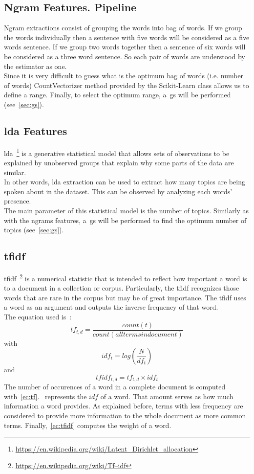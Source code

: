 \subsection{Ngram Features. Pipeline}
Ngram extractions consist of grouping the words into bag of words. If we group the words individually then a sentence with five words will be considered as a five words sentence. If we group two words together then a sentence of six words will be considered as a three word sentence. So each pair of words are understood by the estimator as one.\\
Since it is very difficult to guess what is the optimum bag of words (i.e. number of words) CountVectorizer method provided by the Scikit-Learn class allows us to define a range. Finally, to select the optimum range, a~\ac{gs} will be performed (see~\cref{sec:gs}).
\subsection{\acf{lda} Features}
\ac{lda}~\footnote{\url{https://en.wikipedia.org/wiki/Latent_Dirichlet_allocation}} is a generative statistical model that allows sets of observations to be explained by unobserved groups that explain why some parts of the data are similar.\\ In other words, \ac{lda} extraction can be used to extract how many topics are being spoken about in the dataset. This can be observed by analyzing each words' presence.\\
The main parameter of this statistical model is the number of topics. Similarly as with the ngrams features, a~\ac{gs} will be performed to find the optimum number of topics (see~\cref{sec:gs}).
\subsection{\acf{tfidf}}
\label{sec:tfidf}
\ac{tfidf}~\footnote{\url{https://en.wikipedia.org/wiki/Tf–idf}} is a numerical statistic that is intended to reflect how important a word is to a document in a collection or corpus. Particularly, the \ac{tfidf} recognizes those words that are rare in the corpus but may be of great importance. The \ac{tfidf} uses a word as an argument and outputs the inverse frequency of that word.\\
The equation used is~\cite{tfidf}:
\begin{equation}
\label{ec:tf}
	tf_{t,d} = \frac{count(t)}{count(alltermsindocument)}
\end{equation}
with
\begin{equation}
\label{ec:idf}
	idf_t=log(\frac{N}{df_t})
\end{equation}
and
\begin{equation}
\label{ec:tfidf}
	tfidf_{t,d}=tf_{t,d}\times idf_t
\end{equation}
The number of occurences of a word in a complete document is computed with~\cref{ec:tf}.~ represents the $idf$ of a word. That amount serves as how much information a word provides. As explained before, terms with less frequency are considered to provide more information to the whole document as more common terms. Finally,~\cref{ec:tfidf} computes the weight of a word.
